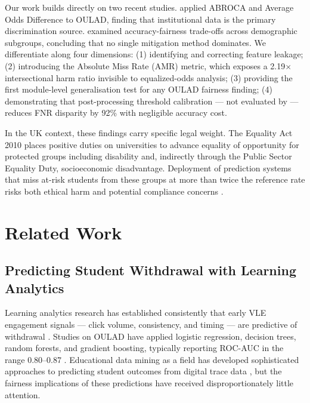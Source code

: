 \documentclass[12pt,a4paper]{article}
\begin{document}
Our work builds directly on two recent studies. \citet{idowu2024} applied
ABROCA and Average Odds Difference to OULAD, finding that institutional data
is the primary discrimination source. \citet{opoku2025} examined
accuracy-fairness trade-offs across demographic subgroups, concluding that no
single mitigation method dominates. We differentiate along four dimensions:
(1) identifying and correcting feature leakage; (2) introducing the Absolute
Miss Rate (AMR) metric, which exposes a 2.19$\times$ intersectional harm
ratio invisible to equalized-odds analysis; (3) providing the first
module-level generalisation test for any OULAD fairness finding; (4)
demonstrating that post-processing threshold calibration --- not evaluated by
\citeauthor{opoku2025} --- reduces FNR disparity by 92\% with negligible
accuracy cost.

In the UK context, these findings carry specific legal weight. The Equality
Act 2010 \citep{equalityact2010} places positive duties on universities to
advance equality of opportunity for protected groups including disability and,
indirectly through the Public Sector Equality Duty, socioeconomic
disadvantage. Deployment of prediction systems that miss at-risk students from
these groups at more than twice the reference rate risks both ethical harm and
potential compliance concerns \citep{holstein2019, prinsloo2013}.

\section{Related Work}

\subsection{Predicting Student Withdrawal with Learning Analytics}

Learning analytics research has established consistently that early VLE
engagement signals --- click volume, consistency, and timing --- are
predictive of withdrawal \citep{kuzilek2017, bakhshinategh2018, hlosta2017}.
Studies on OULAD have applied logistic regression, decision trees, random
forests, and gradient boosting, typically reporting ROC-AUC in the range
0.80--0.87 \citep{opoku2025, bakhshinategh2018}. Educational data mining as
a field has developed sophisticated approaches to predicting student outcomes
from digital trace data \citep{romero2010}, but the fairness implications of
these predictions have received disproportionately little attention.
\end{document}
